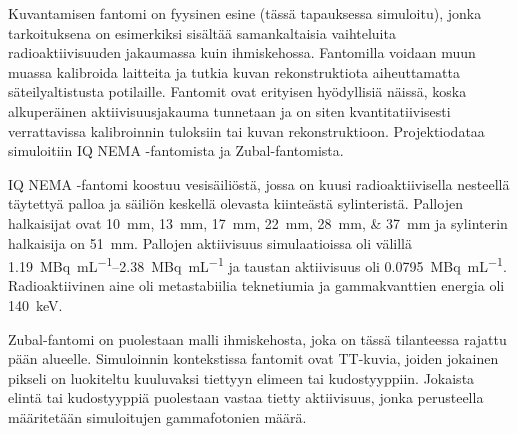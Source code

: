 Kuvantamisen fantomi on fyysinen esine (tässä tapauksessa simuloitu), jonka tarkoituksena on esimerkiksi sisältää samankaltaisia vaihteluita radioaktiivisuuden jakaumassa kuin ihmiskehossa. Fantomilla voidaan muun muassa kalibroida laitteita ja tutkia kuvan rekonstruktiota aiheuttamatta säteilyaltistusta potilaille. Fantomit ovat erityisen hyödyllisiä näissä, koska alkuperäinen aktiivisuusjakauma tunnetaan ja on siten kvantitatiivisesti verrattavissa kalibroinnin tuloksiin tai kuvan rekonstruktioon. Projektiodataa simuloitiin IQ NEMA -fantomista\cite{nema2018} ja Zubal-fantomista\cite{zubal_computerized_1994}.

IQ NEMA -fantomi koostuu vesisäiliöstä, jossa on kuusi radioaktiivisella nesteellä täytettyä palloa ja säiliön keskellä olevasta kiinteästä sylinteristä\cite{nema2018, mancosu_4d-pet_2009}. Pallojen halkaisijat ovat \qtylist{10;13;17;22;28;37}{\milli\meter} ja sylinterin halkaisija on \qty{51}{\milli\meter}\cite{nema2018, mancosu_4d-pet_2009}. Pallojen aktiivisuus simulaatioissa oli välillä \qtyrange{1.19}{2.38}{\mega\becquerel\per\milli\liter} ja taustan aktiivisuus oli \qty{0.0795}{\mega\becquerel\per\milli\liter}. Radioaktiivinen aine oli metastabiilia teknetiumia ja gammakvanttien energia oli \qty{140}{\kilo\electronvolt}.

Zubal-fantomi on puolestaan malli ihmiskehosta, joka on tässä tilanteessa rajattu pään alueelle. Simuloinnin kontekstissa fantomit ovat TT-kuvia, joiden jokainen pikseli on luokiteltu kuuluvaksi tiettyyn elimeen tai kudostyyppiin.\cite{zubal_computerized_1994} Jokaista elintä tai kudostyyppiä puolestaan vastaa tietty aktiivisuus, jonka perusteella määritetään simuloitujen gammafotonien määrä.

